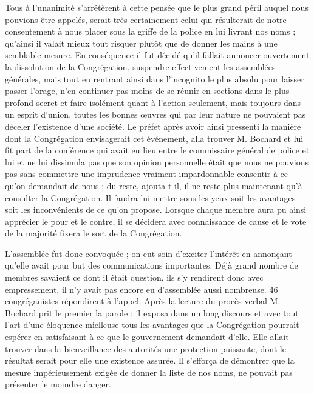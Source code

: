 Tous à l'unanimité s'arrêtèrent à cette pensée que le plus grand péril auquel nous pouvions être appelés, serait très certainement celui qui résulterait de notre consentement à nous placer sous la griffe de la police en lui livrant nos noms ; qu'ainsi il valait mieux tout risquer plutôt que de donner les mains à une semblable mesure. En conséquence il fut décidé qu'il fallait annoncer ouvertement la dissolution de la Congrégation, suspendre effectivement les assemblées générales, mais tout en rentrant ainsi dans l'incognito le plus absolu pour laisser passer l'orage, n'en continuer pas moins de se réunir en sections dans le plus profond secret et faire isolément quant à l'action seulement, mais toujours dans un esprit d'union, toutes les bonnes œuvres qui par leur nature ne pouvaient pas déceler l'existence d'une société. Le préfet après avoir ainsi pressenti la manière dont la Congrégation envisagerait cet événement, alla trouver M. Bochard et lui fit part de la conférence qui avait eu lieu entre le commissaire général de police et lui et ne lui dissimula pas que son opinion personnelle était que nous ne pouvions pas sans commettre une imprudence vraiment impardonnable consentir à ce qu'on demandait de nous ; du reste, ajouta-t-il, il ne reste plus maintenant qu'à consulter la Congrégation. Il faudra lui mettre sous les yeux soit les avantages soit les inconvénients de ce qu'on propose. Lorsque chaque membre aura pu ainsi apprécier le pour et le contre, il se décidera avec connaissance de cause et le vote de la majorité fixera le sort de la Congrégation.

L'assemblée fut donc convoquée ; on eut soin d'exciter l'intérêt en annonçant qu'elle avait pour but des communications importantes. Déjà grand nombre de membres savaient ce dont
il était question, ils s'y rendirent donc avec empressement, il n'y avait pas encore eu d'assemblée aussi nombreuse. 46 congréganistes répondirent à l'appel. Après la lecture du procès-verbal M. Bochard prit le premier la parole ; il exposa dans un long discours et avec tout l'art d'une éloquence mielleuse tous les avantages que la Congrégation pourrait espérer en satisfaisant à ce que le gouvernement demandait d'elle. Elle allait trouver dans la bienveillance des autorités une protection puissante, dont le résultat serait pour elle une existence assurée. Il s'efforça de démontrer que la mesure impérieusement exigée de donner la liste de nos noms, ne pouvait pas présenter le moindre danger.

